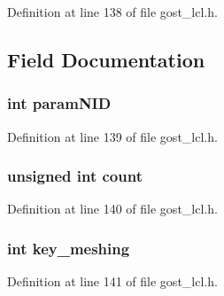 Definition at line 138 of file gost\+\_\+lcl.\+h.



\subsection{Field Documentation}
\subsubsection[{\texorpdfstring{param\+N\+ID}{paramNID}}]{\setlength{\rightskip}{0pt plus 5cm}int param\+N\+ID}\hypertarget{structossl__gost__cipher__ctx_a9255e179af3b5ea6f18f7a36cc911ce3}{}\label{structossl__gost__cipher__ctx_a9255e179af3b5ea6f18f7a36cc911ce3}


Definition at line 139 of file gost\+\_\+lcl.\+h.

\subsubsection[{\texorpdfstring{count}{count}}]{\setlength{\rightskip}{0pt plus 5cm}unsigned int count}\hypertarget{structossl__gost__cipher__ctx_a16ff2d8e15ade4948398b0aeb80124a8}{}\label{structossl__gost__cipher__ctx_a16ff2d8e15ade4948398b0aeb80124a8}


Definition at line 140 of file gost\+\_\+lcl.\+h.

\subsubsection[{\texorpdfstring{key\+\_\+meshing}{key_meshing}}]{\setlength{\rightskip}{0pt plus 5cm}int key\+\_\+meshing}\hypertarget{structossl__gost__cipher__ctx_a0d26c1455c49156afaa4c8194010ed56}{}\label{structossl__gost__cipher__ctx_a0d26c1455c49156afaa4c8194010ed56}


Definition at line 141 of file gost\+\_\+lcl.\+h.

